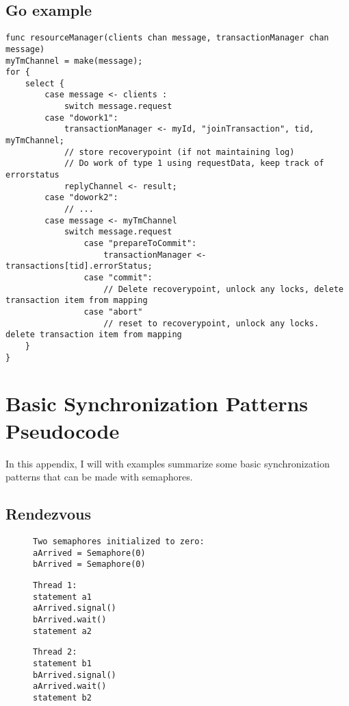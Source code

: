 \subsection{Go example}
\begin{verbatim}
func resourceManager(clients chan message, transactionManager chan message)
myTmChannel = make(message);
for {
	select {
		case message <- clients :
			switch message.request
		case "dowork1":
			transactionManager <- myId, "joinTransaction", tid, myTmChannel;
			// store recoverypoint (if not maintaining log)
			// Do work of type 1 using requestData, keep track of errorstatus
			replyChannel <- result;
		case "dowork2":
			// ...
		case message <- myTmChannel
			switch message.request
				case "prepareToCommit":
					transactionManager <- transactions[tid].errorStatus;
				case "commit":
					// Delete recoverypoint, unlock any locks, delete transaction item from mapping
				case "abort"
					// reset to recoverypoint, unlock any locks. delete transaction item from mapping
	}
}
\end{verbatim}

\section{Basic Synchronization Patterns Pseudocode}
In this appendix, I will with examples summarize some basic synchronization patterns that can be made with semaphores.
\subsection{Rendezvous}
\begin{figure}[H]
\begin{verbatim}
Two semaphores initialized to zero:
aArrived = Semaphore(0)
bArrived = Semaphore(0)

\end{verbatim}
\begin{minipage}{0.5\textwidth}
\centering
\begin{verbatim}
Thread 1:
statement a1
aArrived.signal()
bArrived.wait()
statement a2
\end{verbatim}
\end{minipage}
\begin{minipage}{0.5\textwidth}
\centering
\begin{verbatim}
Thread 2:
statement b1
bArrived.signal()
aArrived.wait()
statement b2
\end{verbatim}
\end{minipage}
\end{figure}

